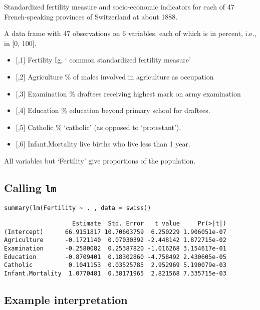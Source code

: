 \documentclass[12pt,]{04-class-files/abntex2}
\providecommand{\tightlist}{%
  \setlength{\itemsep}{0pt}\setlength{\parskip}{0pt}}
\begin{document}
Standardized fertility measure and socio-economic indicators for each of 47 French-speaking provinces of Switzerland at about 1888.

A data frame with 47 observations on 6 variables, each of which is in percent, i.e., in {[}0, 100{]}.

\begin{itemize}
\tightlist
\item
  {[},1{]} Fertility Ig, ` common standardized fertility measure'
\item
  {[},2{]} Agriculture \% of males involved in agriculture as occupation
\item
  {[},3{]} Examination \% draftees receiving highest mark on army examination
\item
  {[},4{]} Education \% education beyond primary school for draftees.
\item
  {[},5{]} Catholic \% `catholic' (as opposed to `protestant').
\item
  {[},6{]} Infant.Mortality live births who live less than 1 year.
\end{itemize}

All variables but `Fertility' give proportions of the population.

\hypertarget{calling-lm}{%
\subsection{\texorpdfstring{Calling \texttt{lm}}{Calling lm}}\label{calling-lm}}

\texttt{summary(lm(Fertility\ \textasciitilde{}\ .\ ,\ data\ =\ swiss))}

\begin{verbatim}
                   Estimate  Std. Error   t value     Pr(>|t|)
(Intercept)      66.9151817 10.70603759  6.250229 1.906051e-07
Agriculture      -0.1721140  0.07030392 -2.448142 1.872715e-02
Examination      -0.2580082  0.25387820 -1.016268 3.154617e-01
Education        -0.8709401  0.18302860 -4.758492 2.430605e-05
Catholic          0.1041153  0.03525785  2.952969 5.190079e-03
Infant.Mortality  1.0770481  0.38171965  2.821568 7.335715e-03
\end{verbatim}

\hypertarget{example-interpretation}{%
\subsection{Example interpretation}\label{example-interpretation}}
\end{document}
